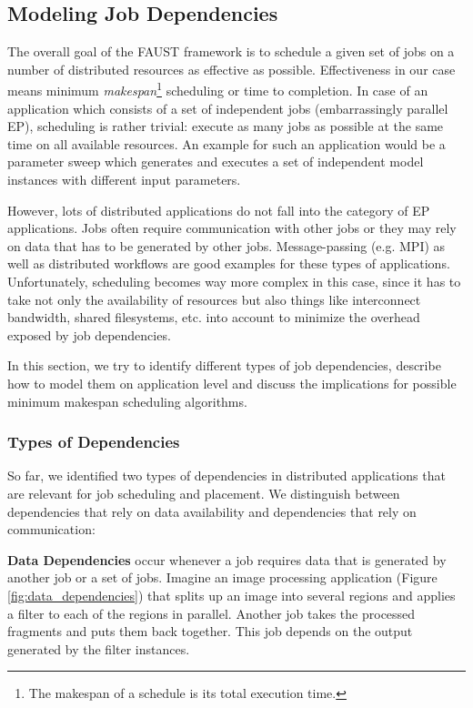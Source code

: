 \subsection{Modeling Job Dependencies}

The overall goal of the FAUST framework is to schedule a given set of jobs on a number of distributed resources as effective as possible. Effectiveness in our case means minimum \textit{makespan}\footnote{The makespan of a schedule is its total execution time.} scheduling or time to completion. In case of an application which consists of a
set of independent jobs (embarrassingly parallel EP), scheduling is rather trivial:
execute as many jobs as possible at the same time on all available resources. An
example for such an application would be a parameter sweep which generates and executes  a set of independent model instances with different input parameters.

However, lots of distributed applications do not fall into the category of EP applications. Jobs often require communication with other jobs or they may rely on data  that has to be generated by other jobs. Message-passing (e.g. MPI) as well as distributed workflows are good examples for these types of applications. Unfortunately, scheduling becomes way more complex in this case, since it has to take not only the availability of resources but also things like interconnect bandwidth, shared filesystems, etc. into account to minimize the overhead exposed by job dependencies.

In this section, we try to identify different types of job dependencies, describe how to model them on application level and discuss the implications for possible minimum 
makespan scheduling algorithms.

\subsubsection{Types of Dependencies}

So far, we identified two types of dependencies in distributed applications that are relevant for job scheduling and placement. We distinguish between dependencies that rely on data availability and dependencies that rely on communication:


\textbf{Data Dependencies} occur whenever a job requires data that is generated by another job or a set of jobs. Imagine an image processing application (Figure \ref{fig:data_dependencies}) that splits up an image into several regions and applies a filter to each of the regions in parallel. Another job takes the processed fragments and puts them back together. This job depends on the output generated by the filter instances. 

